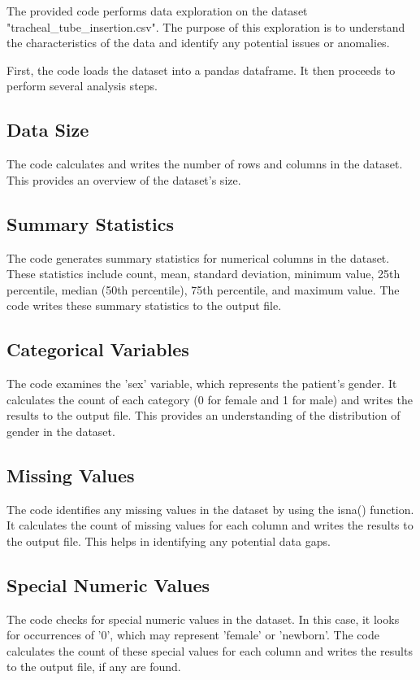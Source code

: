 \documentclass[11pt]{article}
\begin{document}
The provided code performs data exploration on the dataset "tracheal\_tube\_insertion.csv". The purpose of this exploration is to understand the characteristics of the data and identify any potential issues or anomalies.

First, the code loads the dataset into a pandas dataframe. It then proceeds to perform several analysis steps.

\subsection{Data Size}
The code calculates and writes the number of rows and columns in the dataset. This provides an overview of the dataset's size.

\subsection{Summary Statistics}
The code generates summary statistics for numerical columns in the dataset. These statistics include count, mean, standard deviation, minimum value, 25th percentile, median (50th percentile), 75th percentile, and maximum value. The code writes these summary statistics to the output file.

\subsection{Categorical Variables}
The code examines the 'sex' variable, which represents the patient's gender. It calculates the count of each category (0 for female and 1 for male) and writes the results to the output file. This provides an understanding of the distribution of gender in the dataset.

\subsection{Missing Values}
The code identifies any missing values in the dataset by using the isna() function. It calculates the count of missing values for each column and writes the results to the output file. This helps in identifying any potential data gaps.

\subsection{Special Numeric Values}
The code checks for special numeric values in the dataset. In this case, it looks for occurrences of '0', which may represent 'female' or 'newborn'. The code calculates the count of these special values for each column and writes the results to the output file, if any are found.
\end{document}
